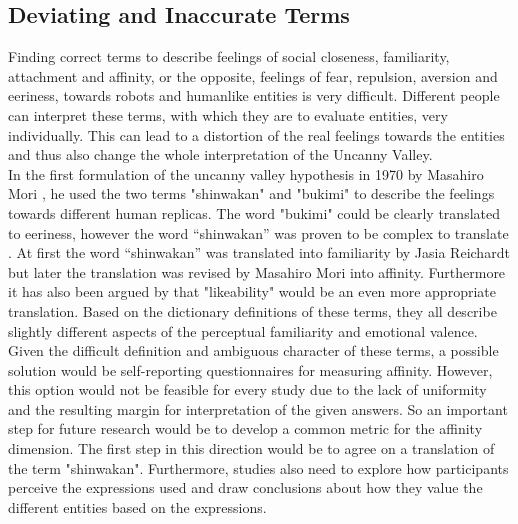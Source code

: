 \subsection{Deviating and Inaccurate Terms}
Finding correct terms to describe feelings of social closeness, familiarity, attachment and affinity, or the opposite, feelings of fear, repulsion, aversion and eeriness, towards robots and humanlike entities is very difficult. Different people can interpret these terms, with which they are to evaluate entities, very individually. This can lead to a distortion of the real feelings towards the entities and thus also change the whole interpretation of the Uncanny Valley.\\
In the first formulation of the uncanny valley hypothesis in 1970 by Masahiro Mori \cite{original_masahiro_not_translated}, he used the two terms "shinwakan" and "bukimi" to describe the feelings towards different human replicas. The word "bukimi" could be clearly translated to eeriness, however the word “shinwakan” was proven to be complex to translate \cite{quant_review}. At first the word “shinwakan” was translated into familiarity by Jasia Reichardt \cite{first_translation} but later the translation was revised by Masahiro Mori into affinity. Furthermore it has also been argued by \cite{uncanny_cliff} that "likeability" would be an even more appropriate translation. Based on the dictionary definitions of these terms, they all describe slightly different aspects of the perceptual familiarity and emotional valence.\\ 
Given the difficult definition and ambiguous character of these terms, a possible solution would be self-reporting questionnaires for measuring affinity. However, this option would not be feasible for every study due to the lack of uniformity and the resulting margin for interpretation of the given answers. So an important step for future research would be to develop a common metric for the affinity dimension. The first step in this direction would be to agree on a translation of the term "shinwakan". Furthermore, studies also need to explore how participants perceive the expressions used and draw conclusions about how they value the different entities based on the expressions. 


